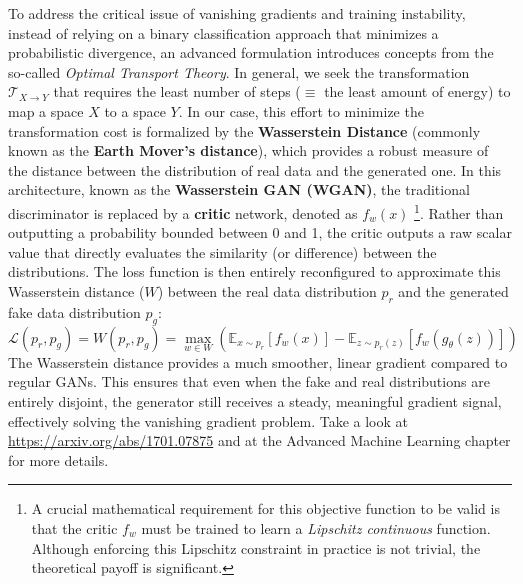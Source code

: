 To address the critical issue of vanishing gradients and training instability, instead of relying on a binary classification approach that minimizes a probabilistic divergence, an advanced formulation introduces concepts from the so-called \textit{Optimal Transport Theory}. In general, we seek the transformation $\mathcal{T}_{X \to Y}$ that requires the least number of steps ($\equiv$ the least amount of energy) to map a space $X$ to a space $Y$. In our case, this effort to minimize the transformation cost is formalized by the \textbf{Wasserstein Distance} (commonly known as the \textbf{Earth Mover's distance}), which provides a robust measure of the distance between the distribution of real data and the generated one. In this architecture, known as the \textbf{Wasserstein GAN (WGAN)}, the traditional discriminator is replaced by a \textbf{critic} network, denoted as $f_w(x)$ \footnote{A crucial mathematical requirement for this objective function to be valid is that the critic $f_w$ must be trained to learn a \textit{Lipschitz continuous} function. Although enforcing this Lipschitz constraint in practice is not trivial, the theoretical payoff is significant.}. Rather than outputting a probability bounded between 0 and 1, the critic outputs a raw scalar value that directly evaluates the similarity (or difference) between the distributions. The loss function is then entirely reconfigured to approximate this Wasserstein distance ($W$) between the real data distribution $p_r$ and the generated fake data distribution $p_g$:
\begin{equation}
    \mathcal{L}(p_r, p_g) = W(p_r, p_g) = \max_{w \in W} \left( \mathbb{E}_{x \sim p_r}[f_w(x)] - \mathbb{E}_{z \sim p_r(z)}[f_w(g_\theta(z))] \right)
\end{equation}
The Wasserstein distance provides a much smoother, linear gradient compared to regular GANs. This ensures that even when the fake and real distributions are entirely disjoint, the generator still receives a steady, meaningful gradient signal, effectively solving the vanishing gradient problem. Take a look at \url{https://arxiv.org/abs/1701.07875} and at the Advanced Machine Learning chapter for more details.

